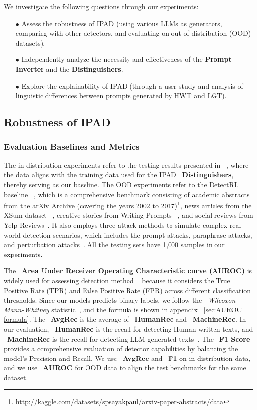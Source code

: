 We investigate the following questions through our experiments:  

\begin{itemize}[itemsep=1pt, topsep=1pt]

\item[$\bullet$]Assess the robustness of IPAD (using various LLMs as generators, comparing with other detectors, and evaluating on out-of-distribution (OOD) datasets).  
\item[$\bullet$]Independently analyze the necessity and effectiveness of the \textbf{Prompt Inverter} and the \textbf{Distinguishers}.  
\item[$\bullet$]Explore the explainability of IPAD (through a user study and analysis of linguistic differences between prompts generated by HWT and LGT).
\end{itemize}

\subsection{Robustness of IPAD}
\subsubsection{Evaluation Baselines and Metrics}
The in-distribution experiments refer to the testing results presented in ~\cite{r3}, where the data aligns with the training data used for the IPAD ~\textbf{Distinguishers}, thereby serving as our baseline. The OOD experiments refer to the DetectRL baseline ~\cite{r58}, which is a comprehensive benchmark consisting of academic abstracts from the arXiv Archive (covering the years 2002 to 2017)\footnote{http://kaggle.com/datasets/spsayakpaul/arxiv-paper-abstracts/data}, news articles from the XSum dataset ~\cite{r59}, creative stories from Writing Prompts ~\cite{r60}, and social reviews from Yelp Reviews~\cite{r61}. It also employs three attack methods to simulate complex real-world detection scenarios, which includes the prompt attacks, paraphrase attacks, and perturbation attacks~\cite{r58}. All the testing sets have 1,000 samples in our experiments.

The ~\textbf{Area Under Receiver Operating Characteristic curve (AUROC)} is widely used for assessing detection method ~\cite{r55} because it considers the True Positive Rate (TPR) and False
Positive Rate (FPR) across different classification thresholds. Since our models predicts binary labels, we follow the ~\textit{Wilcoxon-Mann-Whitney} statistic~\cite{r56}, and the formula is shown in appendix ~\ref{sec:AUROC formula}. 
The ~\textbf{AvgRec} is the average of ~\textbf{HumanRec} and ~\textbf{MachineRec}. In our evaluation, ~\textbf{HumanRec} is the recall for detecting Human-written texts, and ~\textbf{MachineRec} is the recall for detecting LLM-generated texts~\cite{r57}.  The ~\textbf{F1 Score} provides a comprehensive evaluation of detector capabilities by balancing the model’s Precision and Recall. We use ~\textbf{AvgRec} and ~\textbf{F1} on in-distribution data, and we use ~\textbf{AUROC} for OOD data to align the test benchmarks for the same dataset.


